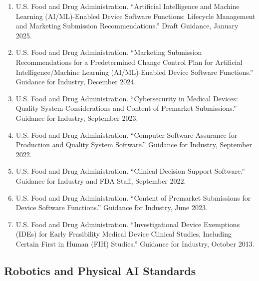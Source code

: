 \begin{enumerate}[resume]
\item U.S. Food and Drug Administration. ``Artificial Intelligence and Machine Learning (AI/ML)-Enabled Device Software Functions: Lifecycle Management and Marketing Submission Recommendations.'' Draft Guidance, January 2025.

\item U.S. Food and Drug Administration. ``Marketing Submission Recommendations for a Predetermined Change Control Plan for Artificial Intelligence/Machine Learning (AI/ML)-Enabled Device Software Functions.'' Guidance for Industry, December 2024.

\item U.S. Food and Drug Administration. ``Cybersecurity in Medical Devices: Quality System Considerations and Content of Premarket Submissions.'' Guidance for Industry, September 2023.

\item U.S. Food and Drug Administration. ``Computer Software Assurance for Production and Quality System Software.'' Guidance for Industry, September 2022.

\item U.S. Food and Drug Administration. ``Clinical Decision Support Software.'' Guidance for Industry and FDA Staff, September 2022.

\item U.S. Food and Drug Administration. ``Content of Premarket Submissions for Device Software Functions.'' Guidance for Industry, June 2023.

\item U.S. Food and Drug Administration. ``Investigational Device Exemptions (IDEs) for Early Feasibility Medical Device Clinical Studies, Including Certain First in Human (FIH) Studies.'' Guidance for Industry, October 2013.
\end{enumerate}

\subsection*{Robotics and Physical AI Standards}


